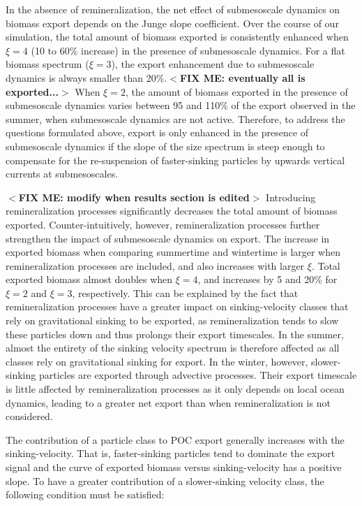 \documentclass[draft,linenumbers]{agujournal2018}
\newcommand{\fixme}[1]{\color{red}$<$\textbf{FIX ME: #1}$>$\color{black}}
\begin{document}
In the absence of remineralization, the net effect of submesoscale dynamics on biomass export depends on the Junge slope coefficient. Over the course of our simulation, the total amount of biomass exported is consistently enhanced when $\xi = 4$ (10 to 60\% increase) in the presence of submesoscale dynamics. For a flat biomass spectrum ($\xi = 3$), the export enhancement due to submesoscale dynamics is always smaller than 20\%.\fixme{eventually all is exported...} When $\xi =2$, the amount of biomass exported in the presence of submesoscale dynamics varies between 95 and 110\% of the export observed in the summer, when submesoscale dynamics are not active. Therefore, to address the questions formulated above, export is only enhanced in the presence of submesoscale dynamics if the slope of the size spectrum is steep enough to compensate for the re-suspension of faster-sinking particles by upwards vertical currents at submesoscales. %

\fixme{modify when results section is edited}
Introducing remineralization processes significantly decreases the total amount of biomass exported. Counter-intuitively, however, remineralization processes further strengthen the impact of submesoscale dynamics on export. The increase in exported biomass when comparing summertime and wintertime is larger when remineralization processes are included, and also increases with larger $\xi$. Total exported biomass almost doubles when $\xi =4$, and increases by 5 and 20\% for $\xi =2$ and $\xi = 3$, respectively. This can be explained by the fact that remineralization processes have a greater impact on sinking-velocity classes that rely on gravitational sinking to be exported, as remineralization tends to slow these particles down and thus prolongs their export timescales. In the summer, almost the entirety of the sinking velocity spectrum is therefore affected as all classes rely on gravitational sinking for export. In the winter, however, slower-sinking particles are exported through advective processes. Their export timescale is little affected by remineralization processes as it only depends on local ocean dynamics, leading to a greater net export than when remineralization is not considered.

The contribution of a particle class to POC export generally increases with the sinking-velocity. That is, faster-sinking particles tend to dominate the export signal and the curve of exported biomass versus sinking-velocity has a positive slope. To have a greater contribution of a slower-sinking velocity class, the following condition must be satisfied:
\end{document}
